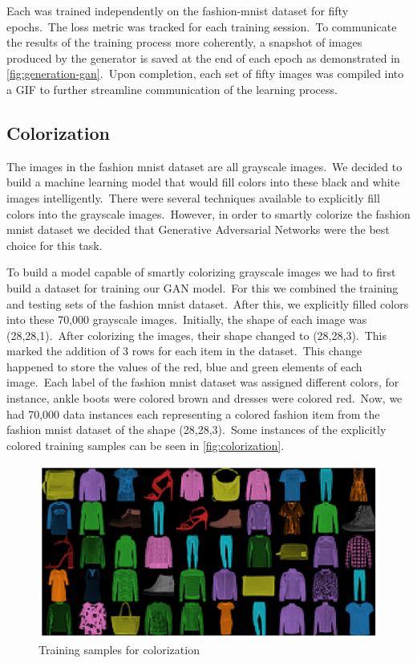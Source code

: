 \documentclass[conference]{IEEEtran}
\begin{document}
    Each was trained independently on the fashion-mnist dataset for fifty epochs.\ The loss metric was tracked for each training session.\ To communicate the results of the training process more coherently, a snapshot of images produced by the generator is saved at the end of each epoch as demonstrated in \autoref{fig:generation-gan}.\ Upon completion, each set of fifty images was compiled into a GIF to further streamline communication of the learning process.

    \subsection{Colorization}\label{subsec:implementation-colorization}

    The images in the fashion mnist dataset are all grayscale images.\ We decided to build a machine learning model that would fill colors into these black and white images intelligently.\ There were several techniques available to explicitly fill colors into the grayscale images.\ However, in order to smartly colorize the fashion mnist dataset we decided that Generative Adversarial Networks were the best choice for this task.

    To build a model capable of smartly colorizing grayscale images we had to first build a dataset for training our GAN model.\ For this we combined the training and testing sets of the fashion mnist dataset.\ After this, we explicitly filled colors into these 70,000 grayscale images.\ Initially, the shape of each image was (28,28,1).\ After colorizing the images, their shape changed to (28,28,3).\ This marked the addition of 3 rows for each item in the dataset.\ This change happened to store the values of the red, blue and green elements of each image.\ Each label of the fashion mnist dataset was assigned different colors, for instance, ankle boots were colored brown and dresses were colored red.\ Now, we had 70,000 data instances each representing a colored fashion item from the fashion mnist dataset of the shape (28,28,3).\ Some instances of the explicitly colored training samples can be seen in \autoref{fig:colorization}.

    \begin{figure}
        \caption{Training samples for colorization}
        \label{fig:colorization}
        \centering
        \includegraphics[scale = 0.33]{Colorization_training_samples.png}
    \end{figure}
\end{document}
